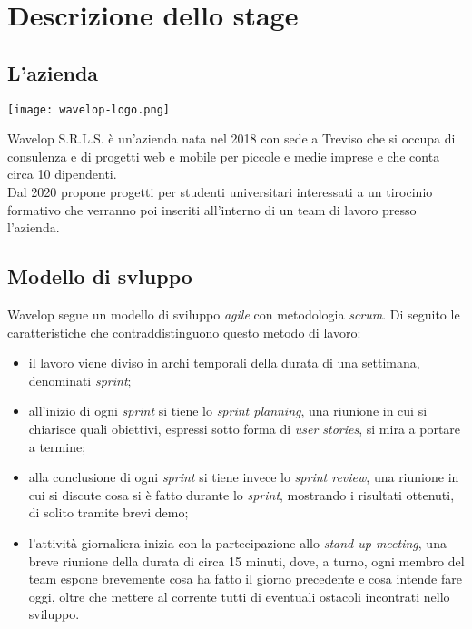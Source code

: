 \chapter{Descrizione dello stage}
\label{cap:azienda}

\section{L'azienda}

\begin{center}
	\texttt{[image: wavelop-logo.png]}
\end{center}

\noindent Wavelop S.R.L.S. è un'azienda nata nel 2018 con sede a Treviso che si occupa di consulenza e di progetti web e mobile per piccole e medie imprese e che conta circa 10 dipendenti.\\
Dal 2020 propone progetti per studenti universitari interessati a un tirocinio formativo che verranno poi  inseriti all'interno di un team di lavoro presso l'azienda.

\section{Modello di svluppo}

Wavelop segue un modello di sviluppo \textit{agile} con metodologia \textit{scrum}. Di seguito le caratteristiche che contraddistinguono questo metodo di lavoro:

\begin{itemize}
  \item il lavoro viene diviso in archi temporali della durata di una settimana, denominati \textit{sprint};
  \item all'inizio di ogni \textit{sprint} si tiene lo \textit{sprint planning}, una riunione in cui si chiarisce quali obiettivi, espressi sotto forma di \textit{user stories}, si mira a portare a termine;
  \item alla conclusione di ogni \textit{sprint} si tiene invece lo \textit{sprint review}, una riunione in cui si discute cosa si è fatto durante lo \textit{sprint}, mostrando i risultati ottenuti, di solito tramite brevi demo;
  \item l'attività giornaliera inizia con la partecipazione allo \textit{stand-up meeting}, una breve riunione della durata di circa 15 minuti, dove, a turno, ogni membro del team espone brevemente cosa ha fatto il giorno precedente e cosa intende fare oggi, oltre che mettere al corrente tutti di eventuali ostacoli incontrati nello sviluppo.
\end{itemize}

